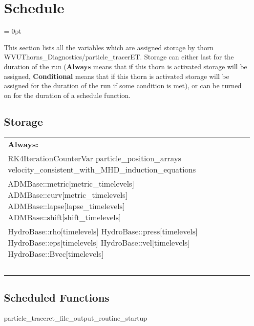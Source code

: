 \section{Schedule} 


\parskip = 0pt


\noindent This section lists all the variables which are assigned storage by thorn WVUThorns\_Diagnostics/particle\_tracerET.  Storage can either last for the duration of the run ({\bf Always} means that if this thorn is activated storage will be assigned, {\bf Conditional} means that if this thorn is activated storage will be assigned for the duration of the run if some condition is met), or can be turned on for the duration of a schedule function.


\subsection*{Storage}

\hspace{5mm}

 \begin{tabular*}{160mm}{ll} 

{\bf Always:}&  ~ \\ 
 RK4IterationCounterVar particle\_position\_arrays velocity\_consistent\_with\_MHD\_induction\_equations & ~\\ 
 ADMBase::metric[metric\_timelevels] ADMBase::curv[metric\_timelevels] ADMBase::lapse[lapse\_timelevels] ADMBase::shift[shift\_timelevels] & ~\\ 
 HydroBase::rho[timelevels] HydroBase::press[timelevels] HydroBase::eps[timelevels] HydroBase::vel[timelevels] HydroBase::Bvec[timelevels] & ~\\ 
~ & ~\\ 
\end{tabular*} 


\subsection*{Scheduled Functions}
\vspace{5mm}


\hspace{5mm} particle\_traceret\_file\_output\_routine\_startup 

\hspace{5mm}{\it create directory for file output. } 


\hspace{5mm}


